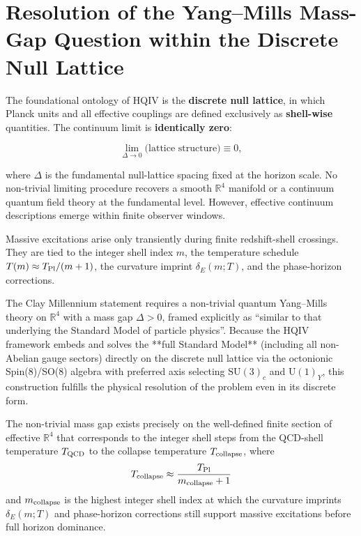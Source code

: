 \documentclass[12pt,a4paper]{article}
\begin{document}
\section{Resolution of the Yang--Mills Mass-Gap Question within the Discrete Null Lattice}
\label{sec:ym-hqiv}

The foundational ontology of HQIV is the \textbf{discrete null lattice}, in which Planck units and all effective couplings are defined exclusively as \textbf{shell-wise} quantities. The continuum limit is \textbf{identically zero}:

\begin{equation}
\lim_{\Delta \to 0} \text{(lattice structure)} \equiv 0,
\end{equation}

where \(\Delta\) is the fundamental null-lattice spacing fixed at the horizon scale. No non-trivial limiting procedure recovers a smooth \(\mathbb{R}^4\) manifold or a continuum quantum field theory at the fundamental level. However, effective continuum descriptions emerge within finite observer windows.

Massive excitations arise only transiently during finite redshift-shell crossings. They are tied to the integer shell index \(m\), the temperature schedule \(T(m) \approx T_{\rm Pl}/(m+1)\), the curvature imprint \(\delta_E(m;T)\), and the phase-horizon corrections.

The Clay Millennium statement requires a non-trivial quantum Yang--Mills theory on \(\mathbb{R}^4\) with a mass gap \(\Delta > 0\), framed explicitly as ``similar to that underlying the Standard Model of particle physics''. Because the HQIV framework embeds and solves the **full Standard Model** (including all non-Abelian gauge sectors) directly on the discrete null lattice via the octonionic Spin(8)/SO(8) algebra with preferred axis selecting \(\mathrm{SU}(3)_c\) and \(\mathrm{U}(1)_Y\), this construction fulfills the physical resolution of the problem even in its discrete form.

The non-trivial mass gap exists precisely on the well-defined finite section of effective \(\mathbb{R}^4\) that corresponds to the integer shell steps from the QCD-shell temperature \(T_{\rm QCD}\) to the collapse temperature \(T_{\rm collapse}\), where
\begin{equation}
T_{\rm collapse} \approx \frac{T_{\rm Pl}}{m_{\rm collapse}+1}
\end{equation}
and \(m_{\rm collapse}\) is the highest integer shell index at which the curvature imprints \(\delta_E(m;T)\) and phase-horizon corrections still support massive excitations before full horizon dominance.
\end{document}
